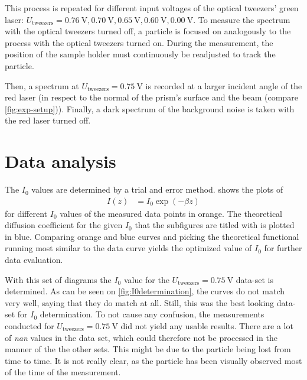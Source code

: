 \documentclass[../bericht.tex]{subfiles}
\begin{document}
      This process is repeated for different input voltages of the optical tweezers' green laser: $U_\mathrm{tweezers}=\SI{0,76}{\volt},\SI{0,70}{\volt},\SI{0,65}{\volt},\SI{0,60}{\volt},\SI{0,00}{\volt}$. To measure the spectrum with the optical tweezers turned off, a particle is focused on analogously to the process with the optical tweezers turned on. During the measurement, the position of the sample holder must continuously be readjusted to track the particle.

      Then, a spectrum at $U_\mathrm{tweezers}=\SI{0,75}{\volt}$ is recorded at a larger incident angle of the red laser (in respect to the normal of the prism's surface and the beam (compare \cref{fig:exp-setup})). Finally, a dark spectrum of the background noise is taken with the red laser turned off.


    \section{Data analysis}
    \label{sec:data-analysis}

       The $I_0$ values are determined by a trial and error method.
       shows the plots of
       \begin{align*}
         I(z)&=I_0 \exp\left( -\beta z \right)
       \end{align*}
       for different $I_0$ values of the measured data points in orange. The theoretical diffusion coefficient for the given $I_0$ that the subfigures are titled with is plotted in blue. Comparing orange and blue curves and picking the theoretical functional running most similar to the data curve yields the optimized value of $I_0$ for further data evaluation.
       \medskip

       With this set of diagrams the $I_0$ value for the $U_\mathrm{tweezers}=\SI{0,75}{\volt}$ data-set is determined. As can be seen on \cref{fig:I0determination}, the curves do not match very well, saying that they do match at all. Still, this was the best looking data-set for $I_0$ determination. To not cause any confusion, the measurements conducted for $U_\mathrm{tweezers}=\SI{0,75}{\volt}$ did not yield any usable results. There are a lot of \textit{nan} values in the data set, which could therefore not be processed in the manner of the the other sets. This might be due to the particle being lost from time to time. It is not really clear, as the particle has been visually observed most of the time of the measurement.
      \medskip
\end{document}
